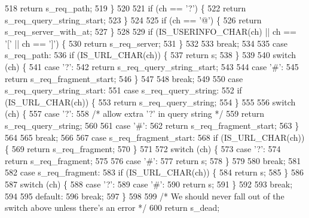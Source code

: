 \begin{DoxyCode}
518         \textcolor{keywordflow}{return} s_req_path;
519       \}
520 
521       \textcolor{keywordflow}{if} (ch == \textcolor{charliteral}{'?'}) \{
522         \textcolor{keywordflow}{return} s_req_query_string_start;
523       \}
524 
525       \textcolor{keywordflow}{if} (ch == \textcolor{charliteral}{'@'}) \{
526         \textcolor{keywordflow}{return} s_req_server_with_at;
527       \}
528 
529       \textcolor{keywordflow}{if} (IS_USERINFO_CHAR(ch) || ch == \textcolor{charliteral}{'['} || ch == \textcolor{charliteral}{']'}) \{
530         \textcolor{keywordflow}{return} s_req_server;
531       \}
532 
533       \textcolor{keywordflow}{break};
534 
535     \textcolor{keywordflow}{case} s_req_path:
536       \textcolor{keywordflow}{if} (IS_URL_CHAR(ch)) \{
537         \textcolor{keywordflow}{return} s;
538       \}
539 
540       \textcolor{keywordflow}{switch} (ch) \{
541         \textcolor{keywordflow}{case} \textcolor{charliteral}{'?'}:
542           \textcolor{keywordflow}{return} s_req_query_string_start;
543 
544         \textcolor{keywordflow}{case} \textcolor{charliteral}{'#'}:
545           \textcolor{keywordflow}{return} s_req_fragment_start;
546       \}
547 
548       \textcolor{keywordflow}{break};
549 
550     \textcolor{keywordflow}{case} s_req_query_string_start:
551     \textcolor{keywordflow}{case} s_req_query_string:
552       \textcolor{keywordflow}{if} (IS_URL_CHAR(ch)) \{
553         \textcolor{keywordflow}{return} s_req_query_string;
554       \}
555 
556       \textcolor{keywordflow}{switch} (ch) \{
557         \textcolor{keywordflow}{case} \textcolor{charliteral}{'?'}:
558           \textcolor{comment}{/* allow extra '?' in query string */}
559           \textcolor{keywordflow}{return} s_req_query_string;
560 
561         \textcolor{keywordflow}{case} \textcolor{charliteral}{'#'}:
562           \textcolor{keywordflow}{return} s_req_fragment_start;
563       \}
564 
565       \textcolor{keywordflow}{break};
566 
567     \textcolor{keywordflow}{case} s_req_fragment_start:
568       \textcolor{keywordflow}{if} (IS_URL_CHAR(ch)) \{
569         \textcolor{keywordflow}{return} s_req_fragment;
570       \}
571 
572       \textcolor{keywordflow}{switch} (ch) \{
573         \textcolor{keywordflow}{case} \textcolor{charliteral}{'?'}:
574           \textcolor{keywordflow}{return} s_req_fragment;
575 
576         \textcolor{keywordflow}{case} \textcolor{charliteral}{'#'}:
577           \textcolor{keywordflow}{return} s;
578       \}
579 
580       \textcolor{keywordflow}{break};
581 
582     \textcolor{keywordflow}{case} s_req_fragment:
583       \textcolor{keywordflow}{if} (IS_URL_CHAR(ch)) \{
584         \textcolor{keywordflow}{return} s;
585       \}
586 
587       \textcolor{keywordflow}{switch} (ch) \{
588         \textcolor{keywordflow}{case} \textcolor{charliteral}{'?'}:
589         \textcolor{keywordflow}{case} \textcolor{charliteral}{'#'}:
590           \textcolor{keywordflow}{return} s;
591       \}
592 
593       \textcolor{keywordflow}{break};
594 
595     \textcolor{keywordflow}{default}:
596       \textcolor{keywordflow}{break};
597   \}
598 
599   \textcolor{comment}{/* We should never fall out of the switch above unless there's an error */}
600   \textcolor{keywordflow}{return} s_dead;
\end{DoxyCode}


